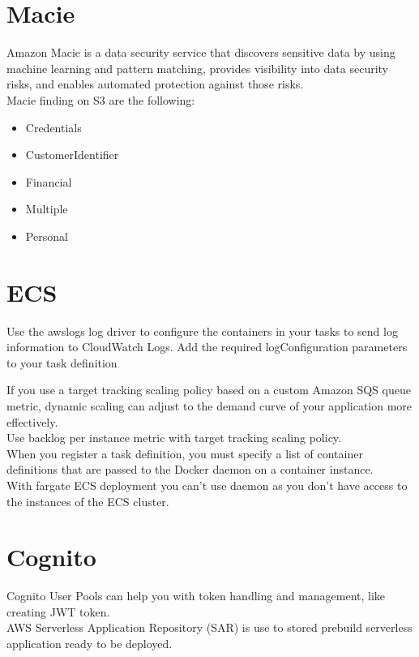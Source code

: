 \documentclass[12pt, letterpaper, twoside]{article}
\begin{document}
\section{Macie}
Amazon Macie is a data security service that discovers sensitive data by using machine learning and pattern matching, provides 
visibility into data security risks, and enables automated protection against those risks.\\
Macie finding on S3 are the following:
\begin{itemize}
	\item Credentials
	\item CustomerIdentifier 
	\item Financial
	\item Multiple
	\item Personal
\end{itemize}


\section{ECS}
Use the awslogs log driver to configure the containers in your tasks to send log information to CloudWatch Logs.
Add the required logConfiguration parameters to your task definition

If you use a target tracking scaling policy based on a custom Amazon SQS queue metric, dynamic scaling can adjust 
to the demand curve of your application more effectively.\\
Use backlog per instance metric with target tracking scaling policy.\\

When you register a task definition, you must specify a list of container definitions that are passed 
to the Docker daemon on a container instance.\\

With fargate ECS deployment you can't use daemon as you don't have access to the instances of the ECS cluster.\\
\section{Cognito}

Cognito User Pools can help you with token handling and management, like creating JWT token.\\

AWS Serverless Application Repository (SAR) is use to stored prebuild serverless application ready to be deployed.\\
\end{document}
